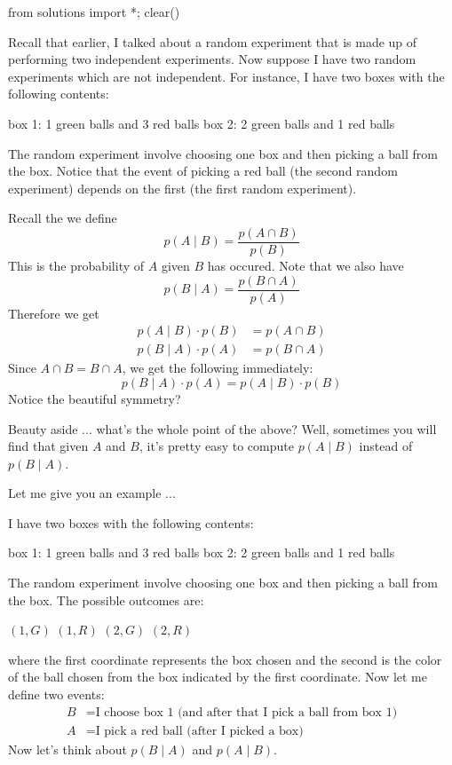 \begin{python0}
from solutions import *; clear()
\end{python0}

Recall that earlier,
I talked about a random experiment that is
made up of performing two independent experiments.
Now suppose I have two random experiments which
are not independent.
For instance, I have two boxes with the following contents:
\begin{tightlist}
\li box 1: 1 green balls and 3 red balls
\li box 2: 2 green balls and 1 red balls
\end{tightlist}
The random experiment involve choosing one box and
then picking a ball from
the box.
Notice that the event of picking a red ball (the
second random experiment) depends on the first (the
first random experiment).

Recall the we define
\[
p(A \mid B) = \frac{p(A\cap B)}{p(B)}
\]
This is the probability of $A$ given $B$ has occured.
Note that we also have
\[
p(B \mid A) = \frac{p(B\cap A)}{p(A)}
\]
Therefore we get
\begin{align*}
p(A\mid B) \cdot p(B) &= p(A \cap B) \\
p(B\mid A) \cdot p(A) &= p(B \cap A) 
\end{align*}
Since $A\cap B = B \cap A$, we get the following immediately:
\[
p(B \mid  A) \cdot p(A)
=
p(A \mid  B) \cdot p(B) 
\]
Notice the beautiful symmetry?

Beauty aside ... what's the whole point of the above?
Well, sometimes you will find that given $A$ and $B$,
it's pretty easy to 
compute $p(A\mid B)$ instead of $p(B\mid A)$.

Let me give  you an example ...

\newpage
\begin{eg}
I have two boxes with the following contents:
\begin{tightlist}
\li box 1: 1 green balls and 3 red balls
\li box 2: 2 green balls and 1 red balls
\end{tightlist}
The random experiment involve choosing one box and then picking a ball from
the box.
The possible outcomes are:
\begin{tightlist}
  \li $(1, G)$
  \li $(1, R)$
  \li $(2, G)$
  \li $(2, R)$
\end{tightlist}
where the first coordinate represents the box chosen and the
second is the color of the ball chosen from the box indicated by the
first coordinate.
Now let me define two events:
\begin{align*}
B &= \text{I choose box 1 (and after that I pick a ball from box 1)} \\
A &= \text{I pick a red ball (after I picked a box)}
\end{align*}
Now let's think about $p(B\mid A)$ and $p(A\mid B)$.
\end{eg}

